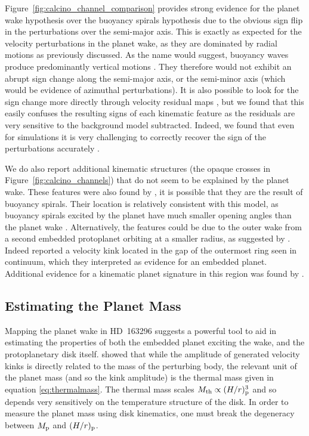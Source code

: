 Figure~\ref{fig:calcino_channel_comparison} provides strong evidence for the planet wake hypothesis over the buoyancy spirals hypothesis due to the obvious sign flip in the perturbations over the semi-major axis.
This is exactly as expected for the velocity perturbations in the planet wake, as they are dominated by radial motions as previously discussed.
As the name would suggest, buoyancy waves produce predominantly vertical motions \citep{bae2021}.
They therefore would not exhibit an abrupt sign change along the semi-major axis, or the semi-minor axis (which would be evidence of azimuthal perturbations).
It is also possible to look for the sign change more directly through velocity residual maps \citep{teague2021,izquierdo2021}, but we found that this easily confuses the resulting signs of each kinematic feature as the residuals are very sensitive to the background model subtracted.
Indeed, we found that even for simulations it is very challenging to correctly recover the sign of the perturbations accurately \citep[see Appendix~A of][for further detail]{calcino2022}.

We do also report additional kinematic structures (the opaque crosses in Figure~\ref{fig:calcino_channels}) that do not seem to be explained by the planet wake.
These features were also found by \citet{teague2021}, it is possible that they are the result of buoyancy spirals.
Their location is relatively consistent with this model, as buoyancy spirals excited by the planet have much smaller opening angles than the planet wake \citep{bae2021}.
Alternatively, the features could be due to the outer wake from a second embedded protoplanet orbiting at a smaller radius, as suggested by \citet{teague2018}.
Indeed \citep{pinte2020} reported a velocity kink located in the gap of the outermost ring seen in continuum, which they interpreted as evidence for an embedded planet.
Additional evidence for a kinematic planet signature in this region was found by \citet{teague2021}. 

\subsection{Estimating the Planet Mass}

Mapping the planet wake in HD~163296 suggests a powerful tool to aid in estimating the properties of both the embedded planet exciting the wake, and the protoplanetary disk itself.
 showed that while the amplitude of generated velocity kinks is directly related to the mass of the perturbing body, the relevant unit of the planet mass (and so the kink amplitude) is the thermal mass \citep{goodman2001} given in equation \ref{eq:thermalmass}.
The thermal mass scales $M_{\rm th} \propto (H/r)_{\rm p}^3$ and so depends very sensitively on the temperature structure of the disk.
In order to measure the planet mass using disk kinematics, one must break the degeneracy between $M_{\rm p}$ and $(H/r)_{\rm p}$.

